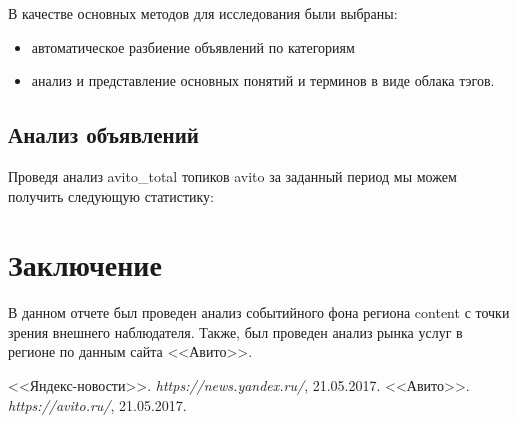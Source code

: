 \documentclass[a4paper,14pt]{extarticle}
\begin{document}
В качестве основных методов для исследования были выбраны:
\begin{itemize}
\item автоматическое разбиение объявлений по категориям
\item анализ и представление основных понятий и терминов в виде облака тэгов. 
\end{itemize}

\subsection{Анализ объявлений}
Проведя анализ  {{ avito_total }} топиков avito за заданный период мы можем получить следующую статистику:

\begin{enumerate}
  {%
    \item Найдено {{ frequency }} услуг в категории \textbf{ {{ topic }} } \\
    \texttt{[image: \{ '\{' ]}}{{ img_path }}{{ '}' }}
  {%
  
\end{enumerate}

\newpage

\section{Заключение}
В данном отчете был проведен анализ событийного фона региона {{ content }} с точки зрения внешнего наблюдателя. Также, был проведен анализ рынка услуг в регионе по данным сайта <<Авито>>. 
\newpage

\begin{thebibliography}{9}
<<Яндекс-новости>>. 
\textit{https://news.yandex.ru/}, 21.05.2017.
<<Авито>>. 
\textit{https://avito.ru/}, 21.05.2017.
\end{thebibliography}
\end{document}
